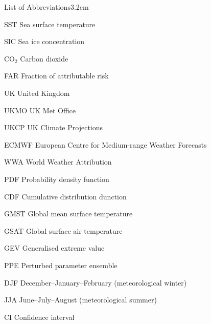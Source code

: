 \begin{mclistof}{List of Abbreviations}{3.2cm}

    \item[SST] Sea surface temperature
    \item[SIC] Sea ice concentration
    \item[CO$_2$] Carbon dioxide
    \item[FAR] Fraction of attributable risk
    \item[UK] United Kingdom
    \item[UKMO] UK Met Office
    \item[UKCP] UK Climate Projections
    \item[ECMWF] European Centre for Medium-range Weather Forecasts
    \item[WWA] World Weather Attribution
    \item[PDF] Probability density function
    \item[CDF] Cumulative distribution dunction
    \item[GMST] Global mean surface temperature
    \item[GSAT] Global surface air temperature
    \item[GEV] Generalised extreme value
    \item[PPE] Perturbed parameter ensemble
    \item[DJF] December--January--February (meteorological winter)
    \item[JJA] June--July--August (meteorological summer)
    \item[CI] Confidence interval 

\end{mclistof}